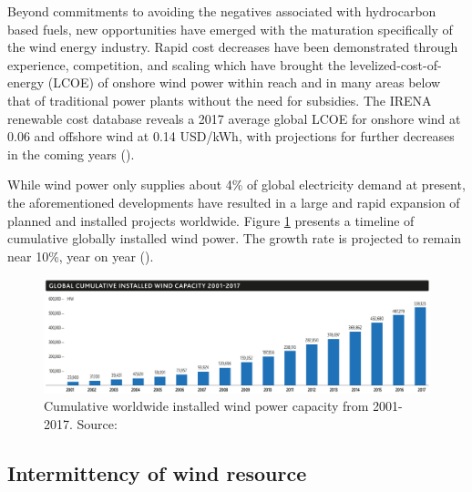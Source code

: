 Beyond commitments to avoiding the negatives associated with hydrocarbon based fuels, new opportunities have emerged with the maturation specifically of the wind energy industry. Rapid cost decreases have been demonstrated through experience, competition, and scaling which have brought the levelized-cost-of-energy (LCOE) of onshore wind power within reach and in many areas below that of traditional power plants without the need for subsidies. The IRENA renewable cost database reveals a 2017 average global LCOE for onshore wind at 0.06 and offshore wind at 0.14 USD/kWh, with projections for further decreases in the coming years (\cite{IRENA_2018}).

While wind power only supplies about 4\% of global electricity demand at present, the aforementioned developments have resulted in a large and rapid expansion of planned and installed projects worldwide. Figure \ref{fig:wind_power_cum} presents a timeline of cumulative globally installed wind power. The growth rate is projected to remain near 10\%, year on year (\cite{gwec_global_2017}).

\begin{figure}[htbp]
    \centering
        \includegraphics[width=1.0\textwidth]{graphics/intro/motivation_market/wind_power_cum.png}
    \caption{Cumulative worldwide installed wind power capacity from 2001-2017. Source: \cite{gwec_global_2017}}
    \label{fig:wind_power_cum}
\end{figure}

\clearpage
\subsection{Intermittency of wind resource}
\label{sec:intro_intermittency}

